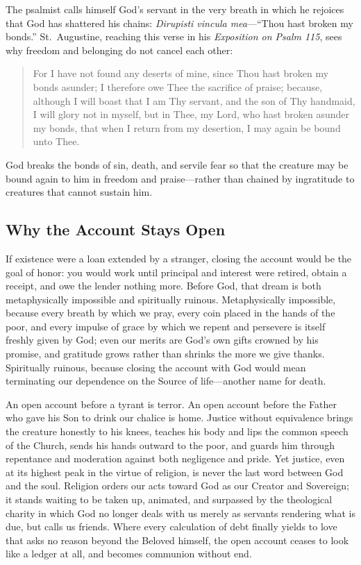 The psalmist calls himself God's servant in the very breath in which he rejoices that God has shattered his chains: \emph{Dirupisti vincula mea}---``Thou hast broken my bonds.'' St.\ Augustine, reaching this verse in his \emph{Exposition on Psalm 115}, sees why freedom and belonging do not cancel each other:

\begin{quote}
For I have not found any deserts of mine, since Thou hast broken my bonds asunder; I therefore owe Thee the sacrifice of praise; because, although I will boast that I am Thy servant, and the son of Thy handmaid, I will glory not in myself, but in Thee, my Lord, who hast broken asunder my bonds, that when I return from my desertion, I may again be bound unto Thee.
\end{quote}

God breaks the bonds of sin, death, and servile fear so that the creature may be bound again to him in freedom and praise---rather than chained by ingratitude to creatures that cannot sustain him.

\subsection{Why the Account Stays Open}

If existence were a loan extended by a stranger, closing the account would be the goal of honor: you would work until principal and interest were retired, obtain a receipt, and owe the lender nothing more. Before God, that dream is both metaphysically impossible and spiritually ruinous. Metaphysically impossible, because every breath by which we pray, every coin placed in the hands of the poor, and every impulse of grace by which we repent and persevere is itself freshly given by God; even our merits are God's own gifts crowned by his promise, and gratitude grows rather than shrinks the more we give thanks. Spiritually ruinous, because closing the account with God would mean terminating our dependence on the Source of life---another name for death.

An open account before a tyrant is terror. An open account before the Father who gave his Son to drink our chalice is home. Justice without equivalence brings the creature honestly to his knees, teaches his body and lips the common speech of the Church, sends his hands outward to the poor, and guards him through repentance and moderation against both negligence and pride. Yet justice, even at its highest peak in the virtue of religion, is never the last word between God and the soul. Religion orders our acts toward God as our Creator and Sovereign; it stands waiting to be taken up, animated, and surpassed by the theological charity in which God no longer deals with us merely as servants rendering what is due, but calls us friends. Where every calculation of debt finally yields to love that asks no reason beyond the Beloved himself, the open account ceases to look like a ledger at all, and becomes communion without end.
